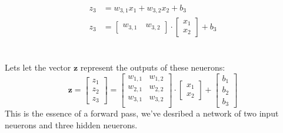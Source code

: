 \documentclass[9pt]{extarticle}
\begin{document}
\begin{minipage}{0.3\textwidth}
    \begin{center}

        \begin{align*}
            z_3 & = w_{3,1}x_1 + w_{3,2}x_2 + b_3                                                                           \\
            z_3 & = \begin{bmatrix} w_{3,1} \quad w_{3,2} \end{bmatrix}\cdot \begin{bmatrix} x_1 \\ x_2 \end{bmatrix} + b_3 \\
        \end{align*}
    \end{center}
\end{minipage} \\
Lets let the vector $\mathbf{z}$ represent the outputs of these neuerons:
$$
    \mathbf{z} =
    \begin{bmatrix}
        z_1 \\ z_2 \\ z_3
    \end{bmatrix}
    =
    \begin{bmatrix}
        w_{1,1} & w_{1,2} \\
        w_{2,1} & w_{2,2} \\
        w_{3,1} & w_{3,2} \\
    \end{bmatrix} \cdot \begin{bmatrix}
        x_1 \\ x_2
    \end{bmatrix} +
    \begin{bmatrix}
        b_1 \\ b_2 \\ b_3
    \end{bmatrix}
$$
This is the essence of a forward pass, we've desribed a network of two input neuerons and three hidden neuerons.
\end{document}
